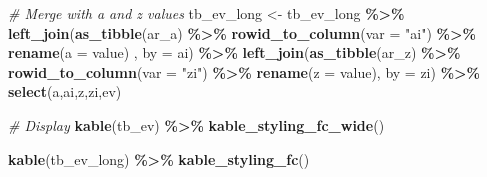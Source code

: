 \documentclass[
]{book}
\newenvironment{Shaded}{\begin{snugshade}}{\end{snugshade}}
\newcommand{\CommentTok}[1]{\textcolor[rgb]{0.56,0.35,0.01}{\textit{#1}}}
\newcommand{\DataTypeTok}[1]{\textcolor[rgb]{0.13,0.29,0.53}{#1}}
\newcommand{\KeywordTok}[1]{\textcolor[rgb]{0.13,0.29,0.53}{\textbf{#1}}}
\newcommand{\NormalTok}[1]{#1}
\newcommand{\OperatorTok}[1]{\textcolor[rgb]{0.81,0.36,0.00}{\textbf{#1}}}
\newcommand{\StringTok}[1]{\textcolor[rgb]{0.31,0.60,0.02}{#1}}
\begin{document}
\begin{Shaded}
\begin{Highlighting}[]
\CommentTok{\# Merge with a and z values}
\NormalTok{tb\_ev\_long \textless{}{-}}\StringTok{ }\NormalTok{tb\_ev\_long }\OperatorTok{\%\textgreater{}\%}
\StringTok{  }\KeywordTok{left\_join}\NormalTok{(}\KeywordTok{as\_tibble}\NormalTok{(ar\_a) }\OperatorTok{\%\textgreater{}\%}
\StringTok{              }\KeywordTok{rowid\_to\_column}\NormalTok{(}\DataTypeTok{var =} \StringTok{"ai"}\NormalTok{) }\OperatorTok{\%\textgreater{}\%}
\StringTok{              }\KeywordTok{rename}\NormalTok{(}\DataTypeTok{a =}\NormalTok{ value)}
\NormalTok{              , }\DataTypeTok{by =} \StringTok{\textquotesingle{}ai\textquotesingle{}}\NormalTok{) }\OperatorTok{\%\textgreater{}\%}
\StringTok{  }\KeywordTok{left\_join}\NormalTok{(}\KeywordTok{as\_tibble}\NormalTok{(ar\_z) }\OperatorTok{\%\textgreater{}\%}
\StringTok{              }\KeywordTok{rowid\_to\_column}\NormalTok{(}\DataTypeTok{var =} \StringTok{"zi"}\NormalTok{) }\OperatorTok{\%\textgreater{}\%}
\StringTok{              }\KeywordTok{rename}\NormalTok{(}\DataTypeTok{z =}\NormalTok{ value),}
            \DataTypeTok{by =} \StringTok{\textquotesingle{}zi\textquotesingle{}}\NormalTok{) }\OperatorTok{\%\textgreater{}\%}
\StringTok{  }\KeywordTok{select}\NormalTok{(a,ai,z,zi,ev)}

\CommentTok{\# Display}
\KeywordTok{kable}\NormalTok{(tb\_ev) }\OperatorTok{\%\textgreater{}\%}\StringTok{ }\KeywordTok{kable\_styling\_fc\_wide}\NormalTok{()}
\end{Highlighting}
\end{Shaded}

\begin{table}[!h]
\centering
{}
\end{table}

\begin{Shaded}
\begin{Highlighting}[]
\KeywordTok{kable}\NormalTok{(tb\_ev\_long) }\OperatorTok{\%\textgreater{}\%}\StringTok{ }\KeywordTok{kable\_styling\_fc}\NormalTok{()}
\end{Highlighting}
\end{Shaded}
\end{document}
